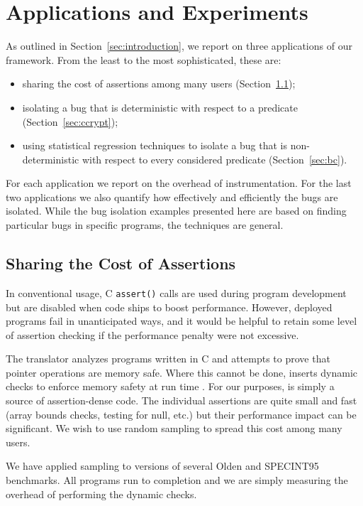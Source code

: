 \section{Applications and Experiments}
\label{sec:applications}

As outlined in Section~\ref{sec:introduction}, we report on three
applications of our framework.  From the least to the most sophisticated,
these are:
\begin{itemize}
\item sharing the cost of assertions among many users (Section~\ref{sec:ccured});

\item isolating a bug that is deterministic with respect to a predicate
(Section~\ref{sec:ccrypt});

\item using statistical regression techniques to isolate a bug that is non-deterministic with respect to every considered predicate (Section~\ref{sec:bc}).
\end{itemize}
For each application we report on the overhead of instrumentation.
For the last two applications we also quantify how effectively and efficiently
the bugs are isolated.  While the bug isolation examples presented here
are based on finding particular bugs in specific programs, 
the techniques are general.


\subsection{Sharing the Cost of Assertions}
\label{sec:ccured}

In conventional usage, C \texttt{assert()} calls are used during
program development but are disabled when code 
ships to boost performance.  However, deployed programs fail in
unanticipated ways, and it would be helpful to retain some level of
assertion checking if the performance penalty were not excessive.

The \CCured translator analyzes programs written in C and
attempts to prove that pointer operations are memory
safe.  Where this cannot be done, \CCured inserts dynamic checks to
enforce memory safety at run time \cite{POPL_'02*128}.  For our purposes, 
\CCured is simply a source of assertion-dense code.
The individual assertions are quite small and fast (array bounds
checks, testing for null, etc.)  but their performance impact can be
significant.  We wish to use random sampling to spread this cost
among many users.

We have applied sampling to \CCured versions of several Olden
\cite{Carlisle:1996:OPPWDDSDMM} and SPECINT95 \cite{SPEC95} benchmarks.
All programs run to completion and we are simply measuring
the overhead of performing the dynamic checks.

